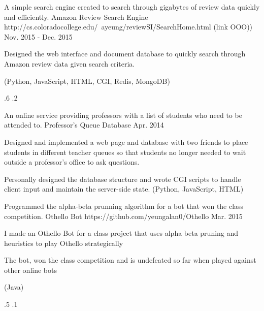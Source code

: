 \begin{cventries}


\myProject
{A simple search engine created to search through gigabytes of review data quickly and efficiently.} %
{Amazon Review Search Engine} %
{http://cs.coloradocollege.edu/~ayeung/reviewSI/SearchHome.html (link OOO))} %
{Nov. 2015 - Dec. 2015} %
{ %
\begin{cvitems}
\item {Designed the web interface and document database to quickly search through Amazon review data given search criteria.}
\item {(Python, JavaScript, HTML, CGI, Redis, MongoDB)}
\end{cvitems}
}
{.6}
{.2}


\cventry
{An online service providing professors with a list of students who need to be attended to.} %
{Professor's Queue Database} %
{} %
{Apr. 2014} %
{ %
\begin{cvitems}
\item {Designed and implemented a web page and database with two friends to place students in different teacher queues so that students no longer needed to wait outside a professor's office to ask questions.}
\item {Personally designed the database structure and wrote CGI scripts to handle client input and maintain the server-side state. (Python, JavaScript, HTML)}
\end{cvitems}
}


\myProject
{Programmed the alpha-beta prunning algorithm for a bot that won the class competition.} %
{Othello Bot} %
{https://github.com/yeungalan0/Othello} %
{Mar. 2015} %
{ %
\begin{cvitems}
\item {I made an Othello Bot for a class project that uses alpha beta pruning and heuristics to play Othello strategically}
\item {The bot, won the class competition and is undefeated so far when played against other online bots}
\item {(Java)}
\end{cvitems}
}
{.5}
{.1}


\end{cventries}
